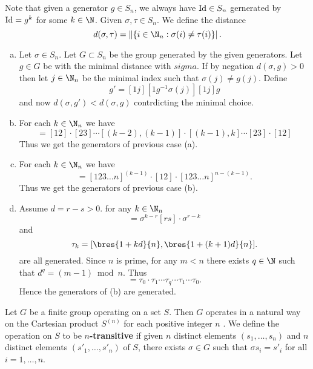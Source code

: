 \documentclass[12pt]{book}
\def\Id{\mathop{\rm Id}\nolimits}
\newcounter{myenumi}
\newenvironment{myenumerate}
{\begin{enumerate}
 \setcounter{enumi}{\themyenumi}
}
{\setcounter{myenumi}{\theenumi}
 \end{enumerate}}
\begin{document}
\begin{myenumerate}
Note that given a generator \(g\in S_n\),
we always have \(\Id\in S_n\) gernerated by \(\Id = g^k\) for some \(k\in\N\).
Given \(\sigma,\tau\in S_n\). We define the distance
\begin{equation*}
d(\sigma,\tau) = \left\|\{i\in\N_n: \sigma(i) \neq \tau(i)\}\right|.
\end{equation*}
\begin{enumerate}[(a)]
\item Let \(\sigma\in S_n\). Let \(G\subset S_n\) be the group generated
by the given generators. Let \(g\in G\) be with the minimal
distance with \(sigma\).
If by negation \(d(\sigma,g) > 0\) then let \(j\in\N_n\)
be the minimal index such that \(\sigma(j)\neq g(j)\).
Define
\begin{equation*}
g' = [1 j][1 g^{-1}\sigma(j)][1 j]g
\end{equation*}
and now \(d(\sigma, g') < d(\sigma, g)\) contrdicting the minimal choice.
\item
For each \(k \in \N_n\) we have
\begin{equation*}
[1 k] = [1 2]\cdot[2 3]\cdots[(k-2),(k-1)]\cdot[(k-1),k]\cdots[2 3]\cdot[1 2]
\end{equation*}
Thus we get the generators of previous case (a).
\item
For each \(k \in \N_n\) we have
\begin{equation*}
[k,(k+1)] = [1 2 3\ldots n]^{(k-1)}\cdot[12]\cdot [1 2 3\ldots n]^{n - (k-1)}.
\end{equation*}
Thus we get the generators of previous case (b).
\item
Assume \(d=r-s>0\). for any \(k\in \N_n\)
\begin{equation*}
[k,\bres{(k+d)}{n}] = \sigma^{k-r}[r s]\cdot\sigma^{r-k}
\end{equation*}
and
\begin{equation*}
\tau_k = [\bres{1 + kd}{n}, \bres{1 + (k+1)d}{n}].
\end{equation*}
are all generated.
Since $n$ is prime, for any \(m < n\) there exists \(q\in\N\) 
such that \(d^q = (m - 1) \bmod n\). Thus
\begin{equation*}
[1 m] = \tau_0\cdot\tau_1\cdots\tau_q\cdots\tau_1\cdots\tau_0.
\end{equation*}
Hence the generators of (b) are generated.
\end{enumerate}

\end{myenumerate}

Let $G$ be a finite group operating on a set $S$.
Then $G$ operates in a natural way on
the Cartesian product \(S^{(n)}\) for each positive integer $n$ .
We define the operation on $S$
to be \hbox{\boldmath$n$\textbf{-transitive}} if given $n$ distinct elements 
\((s_1,\ldots,s_n)\) and $n$ distinct elements
\((s'_1,\ldots,s'_n)\) of $S$, there exists \(\sigma\in G\)
such that \(\sigma s_i = s'_i\) for all \(i = 1,\ldots,n\).
\end{document}
